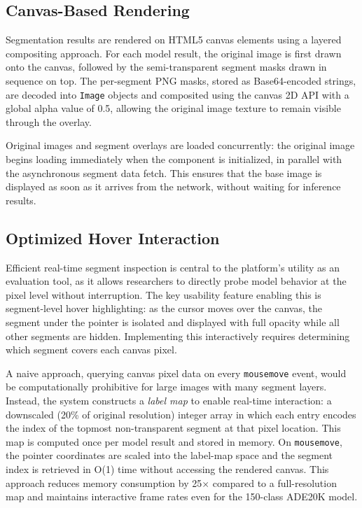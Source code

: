 \documentclass[conference,a4paper,flushend]{iaria}
\begin{document}
\subsection{Canvas-Based Rendering}

Segmentation results are rendered on HTML5 canvas elements using a layered compositing approach. For each model result, the original image is first drawn onto the canvas, followed by the semi-transparent segment masks drawn in sequence on top. The per-segment PNG masks, stored as Base64-encoded strings, are decoded into \texttt{Image} objects and composited using the canvas 2D API with a global alpha value of 0.5, allowing the original image texture to remain visible through the overlay.

Original images and segment overlays are loaded concurrently: the original image begins loading immediately when the component is initialized, in parallel with the asynchronous segment data fetch. This ensures that the base image is displayed as soon as it arrives from the network, without waiting for inference results.

\subsection{Optimized Hover Interaction}

Efficient real-time segment inspection is central to the platform's utility as an evaluation tool, as it allows researchers to directly probe model behavior at the pixel level without interruption. The key usability feature enabling this is segment-level hover highlighting: as the cursor moves over the canvas, the segment under the pointer is isolated and displayed with full opacity while all other segments are hidden. Implementing this interactively requires determining which segment covers each canvas pixel.

A naive approach, querying canvas pixel data on every \texttt{mousemove} event, would be computationally prohibitive for large images with many segment layers. Instead, the system constructs a \textit{label map} to enable real-time interaction: a downscaled (20\% of original resolution) integer array in which each entry encodes the index of the topmost non-transparent segment at that pixel location. This map is computed once per model result and stored in memory. On \texttt{mousemove}, the pointer coordinates are scaled into the label-map space and the segment index is retrieved in O(1) time without accessing the rendered canvas. This approach reduces memory consumption by 25$\times$ compared to a full-resolution map and maintains interactive frame rates even for the 150-class ADE20K model.
\end{document}
